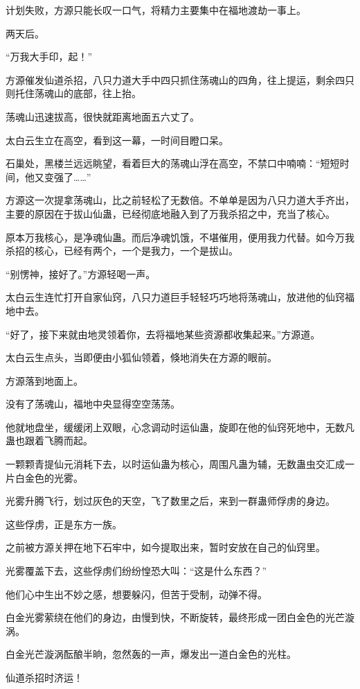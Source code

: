 \begin{this_body}
计划失败，方源只能长叹一口气，将精力主要集中在福地渡劫一事上。

两天后。

“万我大手印，起！”

方源催发仙道杀招，八只力道大手中四只抓住荡魂山的四角，往上提运，剩余四只则托住荡魂山的底部，往上抬。

荡魂山迅速拔高，很快就距离地面五六丈了。

太白云生立在高空，看到这一幕，一时间目瞪口呆。

石巢处，黑楼兰远远眺望，看着巨大的荡魂山浮在高空，不禁口中喃喃：“短短时间，他又变强了……”

方源这一次提拿荡魂山，比之前轻松了无数倍。不单单是因为八只力道大手齐出，主要的原因在于拔山仙蛊，已经彻底地融入到了万我杀招之中，充当了核心。

原本万我核心，是净魂仙蛊。而后净魂饥饿，不堪催用，便用我力代替。如今万我杀招的核心，已经有两个，一个是我力，一个是拔山。

“别愣神，接好了。”方源轻喝一声。

太白云生连忙打开自家仙窍，八只力道巨手轻轻巧巧地将荡魂山，放进他的仙窍福地中去。

“好了，接下来就由地灵领着你，去将福地某些资源都收集起来。”方源道。

太白云生点头，当即便由小狐仙领着，倏地消失在方源的眼前。

方源落到地面上。

没有了荡魂山，福地中央显得空空荡荡。

他就地盘坐，缓缓闭上双眼，心念调动时运仙蛊，旋即在他的仙窍死地中，无数凡蛊也跟着飞腾而起。

一颗颗青提仙元消耗下去，以时运仙蛊为核心，周围凡蛊为辅，无数蛊虫交汇成一片白金色的光雾。

光雾升腾飞行，划过灰色的天空，飞了数里之后，来到一群蛊师俘虏的身边。

这些俘虏，正是东方一族。

之前被方源关押在地下石牢中，如今提取出来，暂时安放在自己的仙窍里。

光雾覆盖下去，这些俘虏们纷纷惶恐大叫：“这是什么东西？”

他们心中生出不妙之感，想要躲闪，但苦于受制，动弹不得。

白金光雾萦绕在他们的身边，由慢到快，不断旋转，最终形成一团白金色的光芒漩涡。

白金光芒漩涡酝酿半晌，忽然轰的一声，爆发出一道白金色的光柱。

仙道杀招时济运！


\end{this_body}

